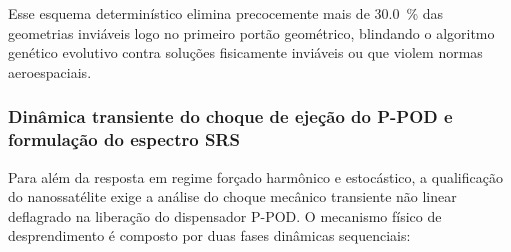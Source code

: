 Esse esquema determinístico elimina precocemente mais de \SI{30.0}{\percent} das geometrias inviáveis logo no primeiro portão geométrico, blindando o algoritmo genético evolutivo contra soluções fisicamente inviáveis ou que violem normas aeroespaciais.

\subsubsection{Dinâmica transiente do choque de ejeção do P-POD e formulação do espectro SRS}
\label{subsubsec:choque-srs}

Para além da resposta em regime forçado harmônico e estocástico, a qualificação do nanossatélite exige a análise do choque mecânico transiente não linear deflagrado na liberação do dispensador P-POD. O mecanismo físico de desprendimento é composto por duas fases dinâmicas sequenciais:
